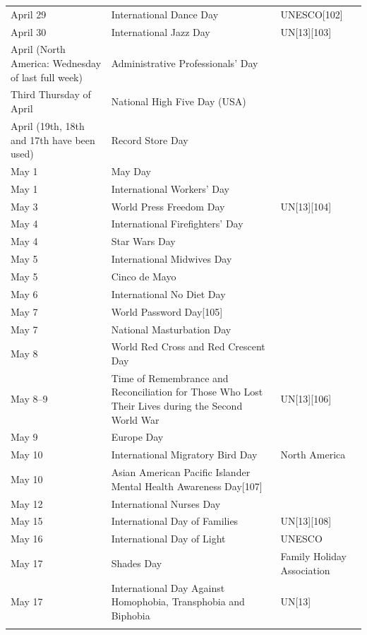 \documentclass[
  openany]{book}
\begin{document}
\begin{longtable}[t]{>{\raggedright\arraybackslash}p{8em}>{\raggedright\arraybackslash}p{20em}>{\raggedright\arraybackslash}p{12em}}
\addlinespace
April 29 & International Dance Day & UNESCO[102]\\
\rowcolor{gray!6}  April 30 & International Jazz Day & UN[13][103]\\
April (North America: Wednesday of last full week) & Administrative Professionals' Day & \\
\rowcolor{gray!6}  Third Thursday of April & National High Five Day (USA) & \\
April (19th, 18th and 17th have been used) & Record Store Day & \\
\addlinespace
\rowcolor{gray!6}  May 1 & May Day & \\
May 1 & International Workers' Day & \\
\rowcolor{gray!6}  May 3 & World Press Freedom Day & UN[13][104]\\
May 4 & International Firefighters' Day & \\
\rowcolor{gray!6}  May 4 & Star Wars Day & \\
\addlinespace
May 5 & International Midwives Day & \\
\rowcolor{gray!6}  May 5 & Cinco de Mayo & \\
May 6 & International No Diet Day & \\
\rowcolor{gray!6}  May 7 & World Password Day[105] & \\
May 7 & National Masturbation Day & \\
\addlinespace
\rowcolor{gray!6}  May 8 & World Red Cross and Red Crescent Day & \\
May 8–9 & Time of Remembrance and Reconciliation for Those Who Lost Their Lives during the Second World War & UN[13][106]\\
\rowcolor{gray!6}  May 9 & Europe Day & \\
May 10 & International Migratory Bird Day & North America\\
\rowcolor{gray!6}  May 10 & Asian American Pacific Islander Mental Health Awareness Day[107] & \\
\addlinespace
May 12 & International Nurses Day & \\
\rowcolor{gray!6}  May 15 & International Day of Families & UN[13][108]\\
May 16 & International Day of Light & UNESCO\\
\rowcolor{gray!6}  May 17 & Shades Day & Family Holiday Association\\
May 17 & International Day Against Homophobia, Transphobia and Biphobia & UN[13]\\
\addlinespace

\end{longtable}
\end{document}
